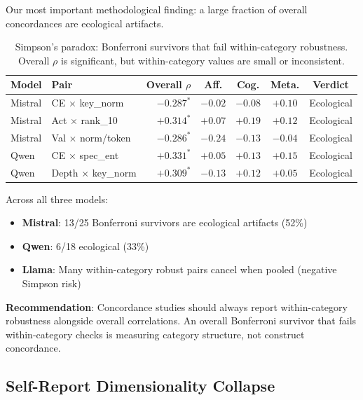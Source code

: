 \documentclass[11pt,a4paper]{article}
\begin{document}
Our most important methodological finding: a large fraction of overall concordances are ecological artifacts.

\begin{table}[H]
\centering
\caption{Simpson's paradox: Bonferroni survivors that fail within-category robustness. Overall $\rho$ is significant, but within-category values are small or inconsistent.}
\label{tab:simpson}
\begin{tabular}{llrcccc}
\toprule
\textbf{Model} & \textbf{Pair} & \textbf{Overall $\rho$} & \textbf{Aff.} & \textbf{Cog.} & \textbf{Meta.} & \textbf{Verdict} \\
\midrule
Mistral & CE $\times$ key\_norm     & $-0.287^*$ & $-0.02$ & $-0.08$ & $+0.10$ & Ecological \\
Mistral & Act $\times$ rank\_10      & $+0.314^*$ & $+0.07$ & $+0.19$ & $+0.12$ & Ecological \\
Mistral & Val $\times$ norm/token    & $-0.286^*$ & $-0.24$ & $-0.13$ & $-0.04$ & Ecological \\
Qwen    & CE $\times$ spec\_ent     & $+0.331^*$ & $+0.05$ & $+0.13$ & $+0.15$ & Ecological \\
Qwen    & Depth $\times$ key\_norm  & $+0.309^*$ & $-0.13$ & $+0.12$ & $+0.05$ & Ecological \\
\bottomrule
\end{tabular}
\end{table}

Across all three models:
\begin{itemize}[nosep]
    \item \textbf{Mistral}: 13/25 Bonferroni survivors are ecological artifacts (52\%)
    \item \textbf{Qwen}: 6/18 ecological (33\%)
    \item \textbf{Llama}: Many within-category robust pairs cancel when pooled (negative Simpson risk)
\end{itemize}

\textbf{Recommendation}: Concordance studies should always report within-category robustness alongside overall correlations. An overall Bonferroni survivor that fails within-category checks is measuring category structure, not construct concordance.

\subsection{Self-Report Dimensionality Collapse}
\label{sec:factor}
\end{document}
